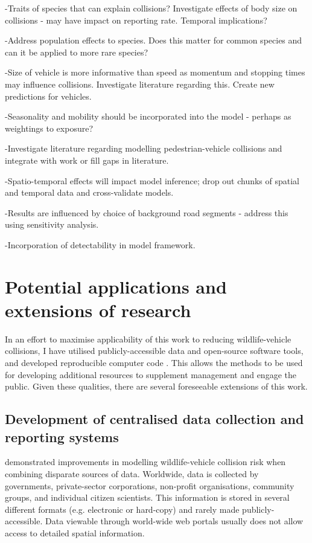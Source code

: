 -Traits of species that can explain collisions? Investigate effects of body size on collisions - may have impact on reporting rate. Temporal implications?

-Address population effects to species.  Does this matter for common species and can it be applied to more rare species?

-Size of vehicle is more informative than speed as momentum and stopping times may influence collisions. Investigate literature regarding this. Create new predictions for vehicles.

-Seasonality and mobility should be incorporated into the model - perhaps as weightings to exposure?

-Investigate literature regarding modelling pedestrian-vehicle collisions and integrate with work or fill gaps in literature.

-Spatio-temporal effects will impact model inference; drop out chunks of spatial and temporal data and cross-validate models.

-Results are influenced by choice of background road segments - address this using sensitivity analysis.

-Incorporation of detectability in model framework.

\section{Potential applications and extensions of research}

In an effort to maximise applicability of this work to reducing wildlife-vehicle collisions, I have utilised publicly-accessible data and open-source software tools, and developed reproducible computer code . This allows the methods to be used for developing additional resources to supplement management and engage the public. Given these qualities, there are several foreseeable extensions of this work. 

\subsection{Development of centralised data collection and reporting systems}

 demonstrated improvements in modelling wildlife-vehicle collision risk when combining disparate sources of data. Worldwide, data is collected by governments, private-sector corporations, non-profit organisations, community groups, and individual citizen scientists. This information is stored in several different formats (e.g. electronic or hard-copy) and rarely made publicly-accessible. Data viewable through world-wide web portals usually does not allow access to detailed spatial information. 

